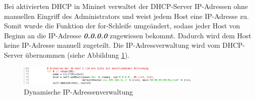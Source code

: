 \documentclass[fontsize=12pt,paper=a4,open=any,parskip=half,
  twoside=false,toc=listof,toc=bibliography,fleqn,leqno,
  captions=nooneline,captions=tableabove,british]{scrbook}
\begin{document}
Bei aktivierten DHCP in Mininet verwaltet der DHCP-Server IP-Adressen ohne manuellen Eingriff des Administrators und weist jedem Host eine IP-Adresse zu. Somit wurde die Funktion der for-Schleife umgeändert, sodass jeder Host von Beginn an die IP-Adresse \textit{\textbf{0.0.0.0}} zugewiesen bekommt. Dadurch wird dem Host keine IP-Adresse manuell zugeteilt. Die IP-Adressverwaltung wird vom DHCP-Server übernommen (siehe Abbildung \ref{forneu}).
  
\begin{figure}[H]
 \centering
 \includegraphics[width=0.8\textwidth]{Bilder/forneu}
 \captionsetup{justification=centering}
 \caption{Dynamische IP-Adressenverwaltung}
 \label{forneu}
\end{figure}
\end{document}
